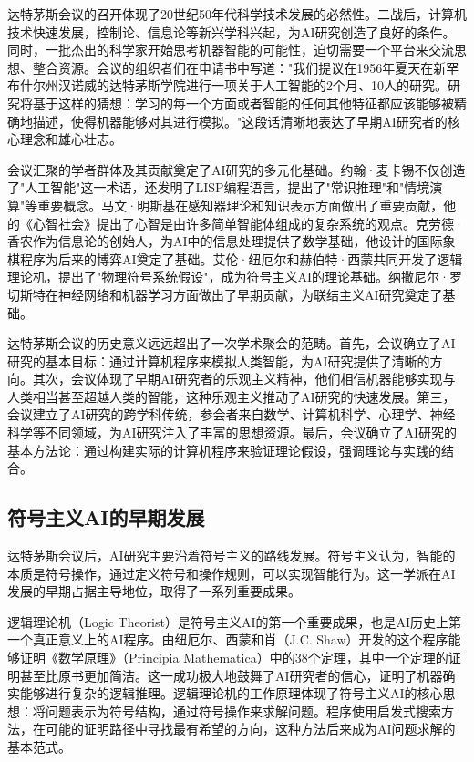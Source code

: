 达特茅斯会议的召开体现了20世纪50年代科学技术发展的必然性。二战后，计算机技术快速发展，控制论、信息论等新兴学科兴起，为AI研究创造了良好的条件。同时，一批杰出的科学家开始思考机器智能的可能性，迫切需要一个平台来交流思想、整合资源。会议的组织者们在申请书中写道："我们提议在1956年夏天在新罕布什尔州汉诺威的达特茅斯学院进行一项关于人工智能的2个月、10人的研究。研究将基于这样的猜想：学习的每一个方面或者智能的任何其他特征都应该能够被精确地描述，使得机器能够对其进行模拟。"这段话清晰地表达了早期AI研究者的核心理念和雄心壮志。

会议汇聚的学者群体及其贡献奠定了AI研究的多元化基础。约翰·麦卡锡不仅创造了"人工智能"这一术语，还发明了LISP编程语言，提出了"常识推理"和"情境演算"等重要概念。马文·明斯基在感知器理论和知识表示方面做出了重要贡献，他的《心智社会》提出了心智是由许多简单智能体组成的复杂系统的观点。克劳德·香农作为信息论的创始人，为AI中的信息处理提供了数学基础，他设计的国际象棋程序为后来的博弈AI奠定了基础。艾伦·纽厄尔和赫伯特·西蒙共同开发了逻辑理论机，提出了"物理符号系统假设"，成为符号主义AI的理论基础。纳撒尼尔·罗切斯特在神经网络和机器学习方面做出了早期贡献，为联结主义AI研究奠定了基础。

达特茅斯会议的历史意义远远超出了一次学术聚会的范畴。首先，会议确立了AI研究的基本目标：通过计算机程序来模拟人类智能，为AI研究提供了清晰的方向。其次，会议体现了早期AI研究者的乐观主义精神，他们相信机器能够实现与人类相当甚至超越人类的智能，这种乐观主义推动了AI研究的快速发展。第三，会议建立了AI研究的跨学科传统，参会者来自数学、计算机科学、心理学、神经科学等不同领域，为AI研究注入了丰富的思想资源。最后，会议确立了AI研究的基本方法论：通过构建实际的计算机程序来验证理论假设，强调理论与实践的结合。

\subsection{符号主义AI的早期发展}

达特茅斯会议后，AI研究主要沿着符号主义的路线发展。符号主义认为，智能的本质是符号操作，通过定义符号和操作规则，可以实现智能行为。这一学派在AI发展的早期占据主导地位，取得了一系列重要成果。

逻辑理论机（Logic Theorist）是符号主义AI的第一个重要成果，也是AI历史上第一个真正意义上的AI程序。由纽厄尔、西蒙和肖（J.C. Shaw）开发的这个程序能够证明《数学原理》（Principia Mathematica）中的38个定理，其中一个定理的证明甚至比原书更加简洁。这一成功极大地鼓舞了AI研究者的信心，证明了机器确实能够进行复杂的逻辑推理。逻辑理论机的工作原理体现了符号主义AI的核心思想：将问题表示为符号结构，通过符号操作来求解问题。程序使用启发式搜索方法，在可能的证明路径中寻找最有希望的方向，这种方法后来成为AI问题求解的基本范式。


